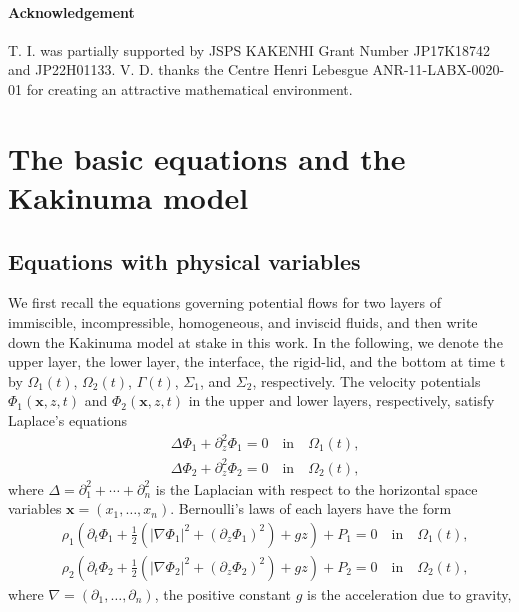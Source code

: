 \documentclass[11pt,leqno]{article}
\numberwithin{equation}{section}
\numberwithin{figure}{section}
\begin{document}
\paragraph{Acknowledgement} 
T. I. was partially supported by JSPS KAKENHI Grant Number JP17K18742 and JP22H01133. 
V. D. thanks the Centre Henri Lebesgue ANR-11-LABX-0020-01 for creating an attractive mathematical environment. 


\section{The basic equations and the Kakinuma model}\label{S.equations}
%
\subsection{Equations with physical variables}
%
We first recall the equations governing potential flows for two layers of immiscible, incompressible, 
homogeneous, and inviscid fluids, and then write down the Kakinuma model at stake in this work. 
In the following, we denote the upper layer, the lower layer, the interface, the rigid-lid, 
and the bottom at time t by $\Omega_1(t)$, $\Omega_2(t)$, $\Gamma(t)$, $\Sigma_1$, and $\Sigma_2$, respectively. 
The velocity potentials $\Phi_1(\bm{x},z,t)$ and $\Phi_2(\bm{x},z,t)$ in the upper and lower layers, respectively, 
satisfy Laplace's equations 
%
\begin{align}
&\label{LaplaceUpper}
 \Delta\Phi_1 +\partial_z^2 \Phi_1= 0 \quad\mbox{in}\quad \Omega_1(t), \\
&\label{LaplaceLower}
 \Delta\Phi_2 +\partial_z^2 \Phi_2= 0 \quad\mbox{in}\quad \Omega_2(t),
\end{align}
%
where $\Delta=\partial_1^2+\cdots+\partial_n^2$ is the Laplacian with respect to the horizontal space variables 
$\bm{x}=(x_1,\ldots,x_n)$. 
Bernoulli's laws of each layers have the form 
%
\begin{align}
&\label{BernoulliUpper}
 \rho_1\left( \partial_t\Phi_1 + \frac12(|\nabla\Phi_1|^2 + (\partial_z\Phi_1)^2) + gz \right) + P_1 = 0
 \quad\mbox{in}\quad \Omega_1(t), \\
&\label{BernoulliLower}
 \rho_2\left( \partial_t\Phi_2 + \frac12(|\nabla\Phi_2|^2 + (\partial_z\Phi_2)^2) + gz \right) + P_2 = 0
 \quad\mbox{in}\quad \Omega_2(t), 
\end{align}
%
where $\nabla=(\partial_1,\ldots,\partial_n)$, the positive constant $g$ is the acceleration due to gravity, 
\end{document}
